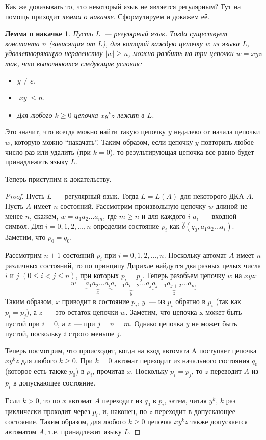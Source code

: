 \documentclass[a4paper,12pt]{article}
\newtheorem*{pumping-lemma}{Лемма о накачке}
\begin{document}
	Как же доказывать то, что некоторый язык не является регулярным? Тут на помощь приходит \textit{лемма о накачке}. Сформулируем и докажем её.
	\begin{pumping-lemma}
		Пусть \(L\)~--- регулярный язык. Тогда существует константа \(n\) (зависящая от \(L\)), для которой каждую цепочку \(w\) из языка \(L\), удовлетворяющую неравенству \(|w| \geqslant n\), можно разбить на три цепочки \(w = xyz\) так, что выполняются следующие условия:
		\begin{itemize}
			\item \(y \neq \varepsilon\).
			\item \(|xy| \leqslant n\).
			\item Для любого \(k \geqslant 0\) цепочка \(xy^kz\) лежит в \(L\).
		\end{itemize}
	\end{pumping-lemma}
	Это значит, что всегда можно найти такую цепочку \(y\) недалеко от начала цепочки \(w\), которую можно ``накачать''. Таким образом, если цепочку \(y\) повторить любое число раз или удалить (при \(k = 0\)), то результирующая цепочка все равно будет принадлежать языку \(L\).
	
	Теперь приступим к докательству.
	\begin{proof}
		Пусть \(L\)~--- регулярный язык. Тогда \(L = L(A)\) для некоторого ДКА \(A\). Пусть \(A\) имеет \(n\) состояний. Рассмотрим произвольную цепочку \(w\) длиной не менее \(n\), скажем, \(w = a_1 a_2 \ldots a_m\), где \(m \geqslant n\) и для каждого \(i\) \(a_i\)~--- входной символ. Для \(i= 0, 1, 2, ...,n\) определим состояние \(p_i\) как \(\hat{\delta}(q_0, a_1 a_2 \ldots a_i)\). Заметим, что \(p_0 = q_0\).
		
		Рассмотрим \(n + 1\) состояний \(p_i\) при \(i = 0, 1, 2, ..., n\). Поскольку автомат \(A\) имеет \(n\) различных состояний, то по принципу Дирихле найдутся два разных целых числа \(i\) и \(j\) \((0 \leqslant i < j \leqslant n)\), при которых \(p_i = p_j\). Теперь разобьем цепочку \(w\) на \(xyz\):
		\[w = \underbrace{a_1 a_2 \ldots a_i}_{x}\underbrace{a_{i + 1} a_{i + 2} \ldots a_j}_{y}\underbrace{a_{j + 1} a_{j + 2} \ldots a_m}_{z}\]
		Таким образом, \(x\) приводит в состояние \(p_i\), \(y\)~--- из \(p_i\) обратно в \(p_i\) (так как \(p_i = p_j\)), а \(z\)~--- это остаток цепочки \(w\). Заметим, что цепочка x может быть пустой при \(i = 0\), а \(z\)~--- при \(j = n = m\). Однако цепочка \(y\) не может быть пустой, поскольку \(i\) строго меньше \(j\).
		
		Теперь посмотрим, что происходит, когда на вход автомата A поступает цепочка \(xy^kz\) для любого \(k \geqslant 0\). При \(k = 0\) автомат переходит из начального состояния \(q_0\) (которое есть также \(p_0\)) в \(p_i\), прочитав \(x\). Поскольку \(p_i = p_j\), то \(z\) переводит \(A\) из \(p_i\) в допускающее состояние.
		
		Если \(k > 0\), то по \(x\) автомат \(A\) переходит из \(q_0\) в \(p_i\), затем, читая \(y^k\), \(k\) раз циклически проходит через \(p_i\), и, наконец, по \(z\) переходит в допускающее состояние. Таким образом, для любого \(k \geqslant 0\) цепочка \(xy^kz\) также допускается автоматом \(A\), т.е. принадлежит языку \(L\).
	\end{proof}
	
\end{document}
